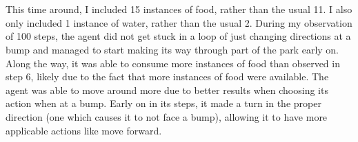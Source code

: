 \documentclass{article}
\begin{document}
    \section{}
        \begin{figure}[hbp]%
            \centering
            \hspace{1in}%
        \end{figure}
        This time around, I included 15 instances of food, rather than the usual 11. I also only included 1 instance of water, rather than the usual 2. During my observation of 100 steps, the agent did not get stuck in a loop of just changing directions at a bump and managed to start making its way through part of the park early on. Along the way, it was able to consume more instances of food than observed in step 6, likely due to the fact that more instances of food were available. The agent was able to move around more due to better results when choosing its action when at a bump. Early on in its steps, it made a turn in the proper direction (one which causes it to not face a bump), allowing it to have more applicable actions like move forward.
\end{document}
